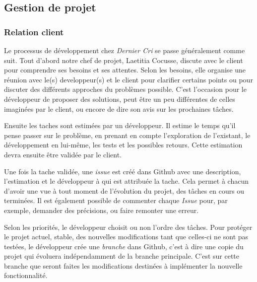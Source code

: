 \subsection{Gestion de projet}\label{gestion-de-projet}

\subsubsection{Relation client}\label{relation-client}

\bigskip

Le processus de développement chez \emph{Dernier Cri} se passe
généralement comme suit. Tout d'abord notre chef de projet, Laetitia
Cocusse, discute avec le client pour comprendre ses besoins et ses
attentes. Selon les besoins, elle organise une réunion avec le(s)
developpeur(s) et le client pour clarifier certains points ou pour
discuter des différents approches du problèmes possible. C'est
l'occasion pour le développeur de proposer des solutions, peut être un
peu différentes de celles imaginées par le client, ou encore de dire son
avis sur les prochaines tâches.

\bigskip

Ensuite les taches sont estimées par un développeur. Il estime le temps
qu'il pense passer sur le problème, en prenant en compte l'exploration
de l'existant, le développement en lui-même, les tests et les possibles
retours. Cette estimation devra ensuite être validée par le client.

\bigskip

Une fois la tache validée, une \emph{issue} est créé dans Github avec
une description, l'estimation et le développeur à qui est attribuée la
tache. Cela permet à chacun d'avoir une vue à tout moment de l'évolution
du projet, des tâches en cours ou terminées. Il est également possible
de commenter chaque \emph{Issue} pour, par exemple, demander des
précisions, ou faire remonter une erreur.

\bigskip

Selon les priorités, le développeur choisit ou non l'ordre des tâches.
Pour protéger le projet actuel, stable, des nouvelles modifications tant
que celles-ci ne sont pas testées, le développeur crée une
\emph{branche} dans Github, c'est à dire une copie du projet qui
évoluera indépendamment de la branche principale. C'est sur cette
branche que seront faites les modifications destinées à implémenter la
nouvelle fonctionnalité.

\bigskip

